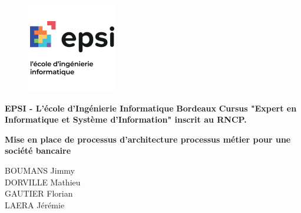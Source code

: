 \documentclass[a4paper,12pt,twoside]{article}
\begin{document}


\begin{figure}
  \centering
  \includegraphics[scale=0.5]{images/epsi_logo.jpg}
  \vspace*{-0.3cm}
\end{figure}

\begin{center}
{\large \rm \textbf {EPSI - L'école d'Ingénierie Informatique} \linebreak}
{\large \rm \textbf {Bordeaux} \linebreak}
{\large \rm \textbf {Cursus "Expert en Informatique et Système d’Information" inscrit au RNCP.} \linebreak}
\end{center}

\baselineskip 30pt

\vspace*{0.3cm}

\begin{center}
{\LARGE \bfseries Mise en place de processus d'architecture processus métier pour une société bancaire}
\end{center}

\vspace*{1cm}

\setcounter{footnote}{1}

\renewcommand{\thefootnote}{\fnsymbol{footnote}}
\begin{center}
{\sc  BOUMANS Jimmy
\\}
{\sc  DORVILLE Mathieu
\\}
{\sc  GAUTIER Florian
\\}
{\sc  LAERA Jérémie
\\}
\vspace*{0.3cm}

 \vspace*{-.5cm} 
\end{center}
\end{document}
